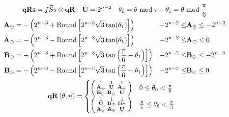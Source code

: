 \begin{gather*}
\begin{aligned}
\qRs &= \fSs \otimes \qR   &   \elemU  &= 2^{n-2 } &
\mTheta{6} &= \theta  \bmod \pi  & \mTheta{1} &= \theta  \bmod \frac{ \pi }{6}\\
\end{aligned} \\
\begin{aligned}
\elemAp  & = - \left(2^{n-3 }+\round{ 2^{n-3 }\sqrt{3} \tan (\thetaA ) }\right) & -2^{n-2} \le & \elemAp \le -2^{n-3} \\
\elemAm & = - \left(2^{n-3 } -\round{ 2^{n-3 }\sqrt{3} \tan (\thetaA )}\right)  & -2^{n-3} \le  & \elemAm \le 0 \\
\elemBp   & = - \left(2^{n-3 } +\round{ 2^{n-3 }\sqrt{3} \tan \left(\frac{\pi }{6}-\thetaA \right) }\right)  & -2^{n-2} \le & \elemBp  \le -2^{n-3} \\
\elemBm  & = - \left(2^{n-3 } -\round{ 2^{n-3 }\sqrt{3} \tan \left(\frac{\pi }{6}-\thetaA \right) }\right)   & -2^{n-3} \le & \elemBm \le 0 \\
\end{aligned} \\
\begin{aligned}
 \qR[\theta, n] %
  &=
\begin{cases}
\left(
\begin{smallmatrix}
 1              & 1             & 1  \\
 \elemAp  & \elemU    & \elemAm \\
 \elemBp   & \elemBm & \elemU \\
\end{smallmatrix}
\right) & 0\leq \mTheta{6}<\frac{\pi }{6} \\
 \left(
\begin{smallmatrix}
 1              & 1             & 1  \\
 \elemU     & \elemBp  & \elemBm \\
 \elemAm  & \elemAp  & \elemU \\
\end{smallmatrix}
\right) & \frac{\pi }{6}\leq \mTheta{6} <\frac{\pi }{3} \\

\end{cases}
\end{aligned}
\end{gather*}
